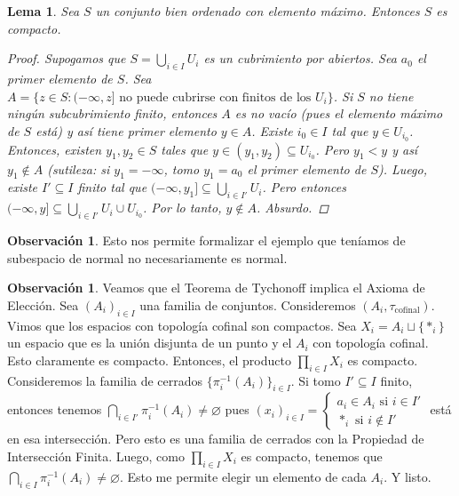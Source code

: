 \documentclass[12pt]{book}
\newtheorem{lem}[teo]{Lema}
\theoremstyle{definition}
\newtheorem{obs}[teo]{Observación}
\let\emptyset\varnothing
\begin{document}
\begin{lem}
Sea $S$ un conjunto bien ordenado con elemento máximo.  Entonces $S$ es compacto.
\begin{proof}
Supogamos que $S=\displaystyle\bigcup_{i\in I} U_i$ es un cubrimiento por abiertos. Sea $a_0$ el primer elemento de $S$. Sea $A=\{z\in S : (-\infty,z]\text{ no puede cubrirse con finitos de los }U_i\}$. Si $S$ no tiene ningún subcubrimiento finito, entonces $A$ es no vacío (pues el elemento máximo de $S$ está) y así tiene primer elemento $y\in A$. Existe $i_0\in I$ tal que $y\in U_{i_0}$. Entonces, existen $y_1,y_2\in S$ tales que $y\in (y_1,y_2)\subseteq U_{i_0}$. Pero $y_1<y$ y así $y_1\notin A$ (sutileza: si $y_1=-\infty$, tomo $y_1=a_0$ el primer elemento de $S$). Luego, existe $I'\subseteq I$ finito tal que $(-\infty,y_1]\subseteq \displaystyle\bigcup_{i\in I'} U_i$. Pero entonces $(-\infty,y]\subseteq \displaystyle\bigcup_{i\in I'}U_i \cup U_{i_0}$. Por lo tanto, $y\notin A$. Absurdo.
\end{proof}
\end{lem}

\begin{obs}
Esto nos permite formalizar el ejemplo que teníamos de subespacio de normal no necesariamente es normal.
\end{obs}

\begin{obs}
Veamos que el Teorema de Tychonoff implica el Axioma de Elección. Sea $(A_i)_{i\in I}$ una familia de conjuntos. Consideremos $(A_i,\tau_{\text{cofinal}})$. Vimos que los espacios con topología cofinal son compactos. Sea $X_i = A_i \sqcup \{*_i\}$ un espacio que es la unión disjunta de un punto y el $A_i$ con topología cofinal. Esto claramente es compacto. Entonces, el producto $\displaystyle\prod_{i\in I}X_i$ es compacto. Consideremos la familia de cerrados $\{\pi_i^{-1}(A_i)\}_{i\in I}$. Si tomo $I'\subseteq I$ finito, entonces tenemos $\displaystyle\bigcap_{i\in I'}\pi_i^{-1}(A_i) \neq \emptyset$ pues $(x_i)_{i\in I} = \begin{cases}a_i\in A_i \text{ si }i\in I' \\ *_i \text{ si }i\notin I' \end{cases}$ está en esa intersección. Pero esto es una familia de cerrados con la Propiedad de Intersección Finita. Luego, como $\displaystyle\prod_{i\in I}X_i$ es compacto, tenemos que $\displaystyle\bigcap_{i\in I}\pi_i^{-1}(A_i)\neq\emptyset$. Esto me permite elegir un elemento de cada $A_i$. Y listo.
\end{obs}
\end{document}
